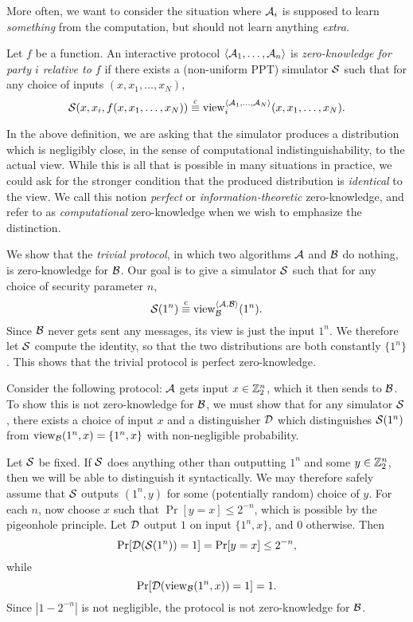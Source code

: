 More often, we want to consider the situation where $\mathcal{A}_i$ is supposed to learn
\emph{something} from the computation, but should not learn anything
\emph{extra}.

\begin{dfn}\label{def:zero-knowledge}
  Let $f$ be a function. An interactive protocol $\langle\mathcal{A}_1, \dots, \mathcal{A}_n\rangle$ is
  \emph{zero-knowledge for party $i$ relative to $f$} if there exists a
  (non-uniform PPT) simulator $\mathcal{S}$ such that for any choice of
  inputs $(x, x_1, \dots, x_N)$, \[
  \mathcal{S}(x, x_i, f(x, x_1, \dots, x_N)) \overset{\text{c}}{\equiv} \operatorname{view}_i^{\langle\mathcal{A}_1, \dots, \mathcal{A}_N\rangle}(x, x_1, \dots, x_N).
\]
\end{dfn}

In the above definition, we are asking that the simulator produces a
distribution which is negligibly close, in the sense of computational
indistinguishability, to the actual view. While this is all that is possible in
many situations in practice, we could ask for the stronger condition that the
produced distribution is \emph{identical} to the view. We call this notion
\emph{perfect} or \emph{information-theoretic} zero-knowledge, and refer to
 as
\emph{computational} zero-knowledge when we wish to emphasize the distinction.

\begin{ex}\label{ex:trivial-protocol}
  We show that the \emph{trivial protocol}, in which two algorithms $\mathcal{A}$ and
  $\mathcal{B}$ do nothing, is zero-knowledge for $\mathcal{B}$. Our goal is to give a
  simulator $\mathcal{S}$ such that for any choice of security parameter $n$,
  \[
    \mathcal{S}(1^n) \overset{\text{c}}{\equiv} \operatorname{view}_{\mathcal{B}}^{\langle\mathcal{A}, \mathcal{B}\rangle}(1^n).
  \] Since $\mathcal{B}$ never gets sent any messages, its view is just the input
  $1^n$. We therefore let $\mathcal{S}$ compute the identity, so that the two
  distributions are both constantly $\{1^n\}$. This shows that the trivial
  protocol is perfect zero-knowledge.
\end{ex}

\begin{ex}\label{ex:non-zero-knowledge}
  Consider the following protocol: $\mathcal{A}$ gets input $x\in\mathbb{Z}_2^n$, which it
  then sends to $\mathcal{B}$. To show this is not zero-knowledge for $\mathcal{B}$, we must
  show that for any simulator $\mathcal{S}$, there exists a choice of input $x$ and a
  distinguisher $\mathcal{D}$ which distinguishes $\mathcal{S}(1^n)$ from $\operatorname{view}_{\mathcal{B}}(1^n, x) =
  \{1^n, x\}$ with non-negligible probability.

  Let $\mathcal{S}$ be fixed. If $\mathcal{S}$ does anything other than outputting $1^n$ and
  some $y\in\mathbb{Z}_2^n$, then we will be able to distinguish it syntactically.
  We may therefore safely assume that $\mathcal{S}$ outputs $(1^n, y)$ for some
  (potentially random) choice of $y$. For each $n$, now choose $x$ such that
  $\Pr[y = x]\leq 2^{-n}$, which is possible by the pigeonhole principle. Let
  $\mathcal{D}$ output $1$ on input $\{1^n, x\}$, and $0$ otherwise. Then \[
    \Pr[\mathcal{D}(\mathcal{S}(1^n)) = 1] = \Pr[y = x] \leq 2^{-n},
  \] while \[
    \Pr[\mathcal{D}(\operatorname{view}_{\mathcal{B}}(1^n, x)) = 1] = 1.
  \] Since $|1 - 2^{-n}|$ is not negligible, the protocol is not
  zero-knowledge for $\mathcal{B}$.
\end{ex}

